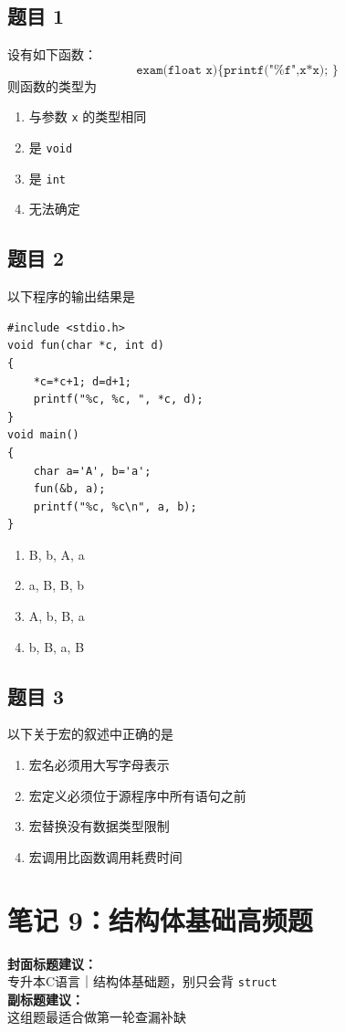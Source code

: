 \documentclass[12pt,a4paper]{ctexart}
\begin{document}
\subsection*{题目 1}
设有如下函数：
\[
\texttt{exam(float x)\{ printf("\%f",x*x); \}}
\]
则函数的类型为
\begin{enumerate}[label=\Alph*.]
    \item 与参数 \texttt{x} 的类型相同
    \item 是 \texttt{void}
    \item 是 \texttt{int}
    \item 无法确定
\end{enumerate}

\subsection*{题目 2}
以下程序的输出结果是
\begin{lstlisting}
#include <stdio.h>
void fun(char *c, int d)
{
    *c=*c+1; d=d+1;
    printf("%c, %c, ", *c, d);
}
void main()
{
    char a='A', b='a';
    fun(&b, a);
    printf("%c, %c\n", a, b);
}
\end{lstlisting}

\begin{enumerate}[label=\Alph*.]
    \item B, b, A, a
    \item a, B, B, b
    \item A, b, B, a
    \item b, B, a, B
\end{enumerate}

\subsection*{题目 3}
以下关于宏的叙述中正确的是
\begin{enumerate}[label=\Alph*.]
    \item 宏名必须用大写字母表示
    \item 宏定义必须位于源程序中所有语句之前
    \item 宏替换没有数据类型限制
    \item 宏调用比函数调用耗费时间
\end{enumerate}

\newpage

\section{笔记 9：结构体基础高频题}
\begin{coverbox}
\textbf{封面标题建议：}\\
专升本C语言｜结构体基础题，别只会背 \texttt{struct}\\
\textbf{副标题建议：}\\
这组题最适合做第一轮查漏补缺
\end{coverbox}
\end{document}
